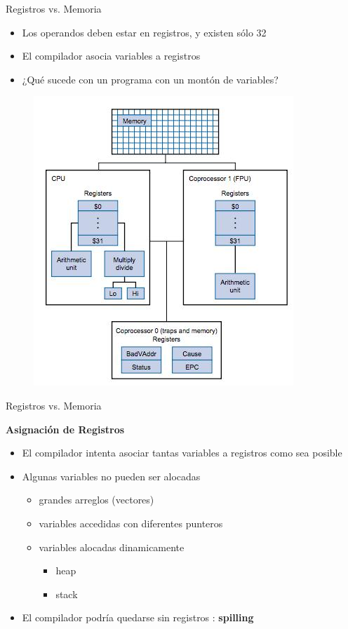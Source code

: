 \documentclass[aspectratio=169,compress]{beamer}
\begin{document}
\begin{footnotesize}
\begin{frame}{Registros vs. Memoria}
\begin{itemize}
\item Los operandos deben estar en registros, y existen sólo 32
\item El compilador asocia variables a registros
\item ¿Qué sucede con un programa con un montón de variables?
\end{itemize}
\begin{center}
\begin{figure}
\includegraphics[scale=0.4]{images/organizacion-mips.jpg} 
\end{figure}
\end{center}
\end{frame}



\begin{frame}{Registros vs. Memoria}
\begin{center}\textbf{Asignación de Registros}\end{center}

\begin{itemize}
\item El compilador intenta asociar tantas variables a registros como sea posible
\item Algunas variables no pueden ser alocadas
\begin{itemize}
\item grandes arreglos (vectores)
\item variables accedidas con diferentes punteros
\item variables alocadas dinamicamente
\begin{itemize}
\item heap
\item stack
\end{itemize}
\end{itemize}
\item El compilador podría quedarse sin registros : \textbf{spilling}
\end{itemize}
\end{frame}





\end{footnotesize}
\end{document}
